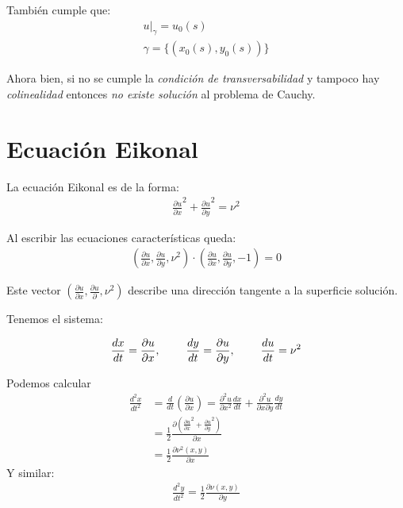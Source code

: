 \documentclass[11pt]{book}
\theoremstyle{plain}
\theoremstyle{definition}
\begin{document}
También cumple que:
\begin{align}
    u|_{\gamma} = u_0(s)\\
    \gamma =\{(x_0(s),y_0(s))\}
\end{align}

Ahora bien, si no se cumple la \emph{condición de transversabilidad} y tampoco hay \emph{colinealidad} entonces \emph{no existe solución} al problema de Cauchy.

\section{Ecuación Eikonal}
La ecuación Eikonal es de la forma:
\setcounter{equation}{0}
\begin{align}
    \frac{\partial u}{\partial x}^{2} + \frac{\partial u}{\partial y}^{2} = \nu ^{2}
\end{align}

Al escribir las ecuaciones características queda:
\begin{align}
    (\frac{\partial u}{\partial x}, \frac{\partial u}{\partial y}, \nu^{2})\cdot(\frac{\partial u}{\partial x},\frac{\partial u}{\partial y},-1) = 0
\end{align}

Este vector $(\frac{\partial u}{\partial x}, \frac{\partial u}{\partial}, \nu^{2})$ describe una dirección tangente a la superficie solución. 

Tenemos el sistema:

\begin{align}
    \frac{dx}{dt} = \frac{\partial u}{\partial x}, \hspace{8mm} \frac{dy}{dt} = \frac{\partial u}{\partial y}, \hspace{8mm}\frac{du}{dt} = \nu^{2}
\end{align}

Podemos calcular
\begin{align*}
    \frac{d^{2}x}{dt^{2}} &= \frac{d}{dt}(\frac{\partial u}{\partial x}) = \frac{\partial^{2} u}{\partial x^{2}}\frac{dx}{dt} + \frac{\partial^{2} u}{\partial x \partial y}\frac{dy}{dt}\\
    &= \frac{1}{2}\frac{\partial (\frac{\partial u}{\partial x} ^{2} + \frac{\partial u}{\partial y} ^{2})}{\partial x} \\
    &= \frac{1}{2} \frac{\partial \nu^{2}(x,y)}{\partial x}
\end{align*}
Y similar:
\begin{align*}
    \frac{d^{2}y}{dt^{2}} = \frac{1}{2} \frac{\partial \nu(x,y)}{\partial y}
\end{align*}
\end{document}
